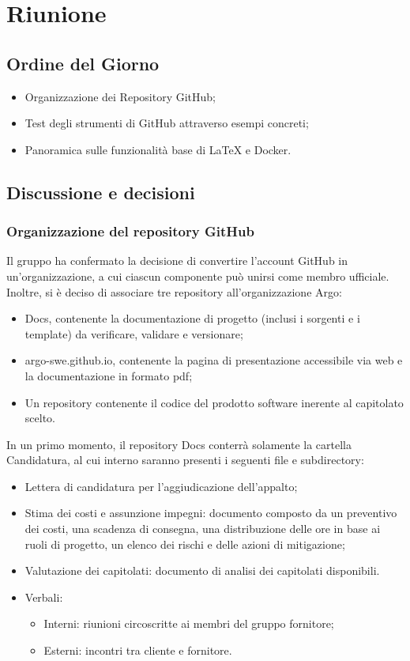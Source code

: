 \section{Riunione}
\subsection{Ordine del Giorno}
\begin{itemize}
	\item Organizzazione dei Repository GitHub;
	\item Test degli strumenti di GitHub attraverso esempi concreti;
	\item Panoramica sulle funzionalità base di LaTeX e Docker.
\end{itemize}

\subsection{Discussione e decisioni}

\subsubsection{Organizzazione del repository GitHub}
Il gruppo ha confermato la decisione di convertire l'account GitHub in un'organizzazione, a cui ciascun componente può unirsi come membro ufficiale. Inoltre, si è deciso di associare tre repository all'organizzazione Argo:
\begin{itemize}
	\item Docs, contenente la documentazione di progetto (inclusi i sorgenti e i template) da verificare, validare e versionare;
	\item argo-swe.github.io, contenente la pagina di presentazione accessibile via web e la documentazione in formato pdf;
	\item Un repository contenente il codice del prodotto software inerente al capitolato scelto.
\end{itemize}

In un primo momento, il repository Docs conterrà solamente la cartella Candidatura, al cui interno saranno presenti i seguenti file e subdirectory:
\begin{itemize}
	\item Lettera di candidatura per l’aggiudicazione dell’appalto;
	\item Stima dei costi e assunzione impegni: documento composto da un preventivo dei costi, una scadenza di consegna, una distribuzione delle ore in base ai ruoli di progetto, un elenco dei rischi e delle azioni di mitigazione;
	\item Valutazione dei capitolati: documento di analisi dei capitolati disponibili.
	\item Verbali:
		\begin{itemize}
			\item Interni: riunioni circoscritte ai membri del gruppo fornitore;
			\item Esterni: incontri tra cliente e fornitore.
		\end{itemize}
\end{itemize}


